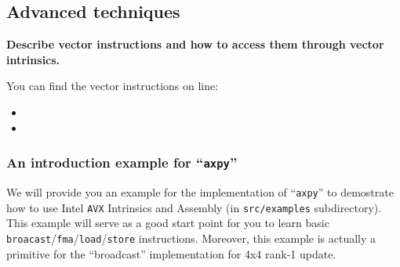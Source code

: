 \subsection{Advanced techniques}

{\bf Describe vector instructions and how to access them through vector intrinsics.}

You can find the vector instructions on line:
\begin{itemize}
\item {}
\item {}
\end{itemize}

\subsubsection{An introduction example for ``{\tt axpy}''}
We will provide you an example for the implementation of ``{\tt axpy}'' to demostrate how to use Intel {\tt AVX} Intrinsics and Assembly (in {\tt src/examples} subdirectory). This example will serve as a good start point for you to learn basic {\tt broacast}/{\tt fma}/{\tt load}/{\tt store} instructions. Moreover, this example is actually a primitive for the ``broadcast'' implementation for 4x4 rank-1 update.

